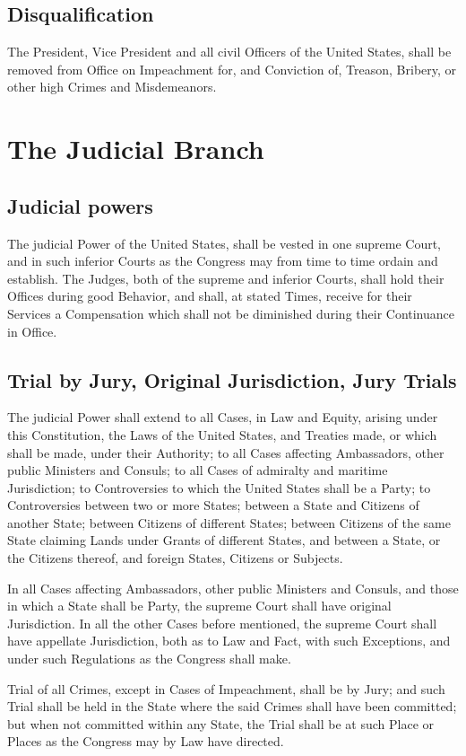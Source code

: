 \documentclass{constitution}
\begin{document}
\section{Disqualification}
The President, Vice President and all civil Officers of the United States,
shall be removed from Office on Impeachment for, and Conviction of,
Treason, Bribery, or other high Crimes and Misdemeanors.

\chapter{The Judicial Branch}
\section{Judicial powers}
The judicial Power of the United States,
shall be vested in one supreme Court,
and in such inferior Courts as the Congress may from time to time ordain and establish.
The Judges, both of the supreme and inferior Courts,
shall hold their Offices during good Behavior,
and shall, at stated Times, receive for their Services a Compensation
which shall not be diminished during their Continuance in Office.

\section{Trial by Jury, Original Jurisdiction, Jury Trials}
The judicial Power shall extend
to all Cases, in Law and Equity, arising under this Constitution,
	the Laws of the United States,
and	Treaties made, or which shall be made, under their Authority;
to all Cases affecting Ambassadors, other public Ministers and Consuls;
to all Cases of admiralty and maritime Jurisdiction;
to Controversies to which the United States shall be a Party;
to Controversies between two or more States;
between a State and Citizens of another State;
between Citizens of different States;
between Citizens of the same State claiming Lands under Grants of different States,
and between a State, or the Citizens thereof, and foreign States, Citizens or Subjects.

In all Cases affecting Ambassadors, other public Ministers and Consuls,
and those in which a State shall be Party,
the supreme Court shall have original Jurisdiction.
In all the other Cases before mentioned,
the supreme Court shall have appellate Jurisdiction, both as to Law and Fact,
with such Exceptions, and under such Regulations as the Congress shall make.

Trial of all Crimes, except in Cases of Impeachment, shall be by Jury;
and such Trial shall be held in the State where the said Crimes shall have been committed;
but when not committed within any State,
the Trial shall be at such Place or Places as the Congress may by Law have directed.
\end{document}
